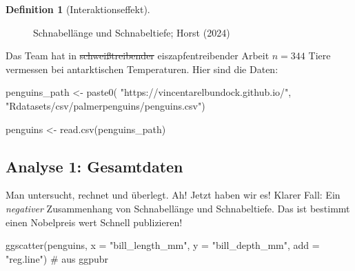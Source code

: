 \documentclass[
  letterpaper,
]{scrbook}
\newenvironment{Shaded}{\begin{snugshade}}{\end{snugshade}}
\newcommand{\AttributeTok}[1]{\textcolor[rgb]{0.40,0.45,0.13}{#1}}
\newcommand{\CommentTok}[1]{\textcolor[rgb]{0.37,0.37,0.37}{#1}}
\newcommand{\FunctionTok}[1]{\textcolor[rgb]{0.28,0.35,0.67}{#1}}
\newcommand{\NormalTok}[1]{\textcolor[rgb]{0.00,0.23,0.31}{#1}}
\newcommand{\OtherTok}[1]{\textcolor[rgb]{0.00,0.23,0.31}{#1}}
\newcommand{\StringTok}[1]{\textcolor[rgb]{0.13,0.47,0.30}{#1}}
\theoremstyle{definition}
\theoremstyle{definition}
\theoremstyle{definition}
\newtheorem{definition}{Definition}[chapter]
\theoremstyle{remark}
\begin{document}
\begin{definition}[Interaktionseffekt]
\begin{figure}


\caption{\label{fig-peng-bill}Schnabellänge und Schnabeltiefe; Horst
(2024)}

\end{figure}%

Das Team hat in \st{schweißtreibender} eiszapfentreibender Arbeit
\(n=344\) Tiere vermessen bei antarktischen Temperaturen. Hier sind die
Daten:

\begin{Shaded}
\begin{Highlighting}[]
\NormalTok{penguins\_path }\OtherTok{\textless{}{-}} \FunctionTok{paste0}\NormalTok{(}
  \StringTok{"https://vincentarelbundock.github.io/"}\NormalTok{,}
  \StringTok{"Rdatasets/csv/palmerpenguins/penguins.csv"}\NormalTok{)}

\NormalTok{penguins }\OtherTok{\textless{}{-}} \FunctionTok{read.csv}\NormalTok{(penguins\_path)}
\end{Highlighting}
\end{Shaded}

\subsection{Analyse 1: Gesamtdaten}\label{analyse-1-gesamtdaten}

Man untersucht, rechnet und überlegt. Ah! Jetzt haben wir es! Klarer
Fall: Ein \emph{negativer} Zusammenhang von Schnabellänge und
Schnabeltiefe. Das ist bestimmt einen Nobelpreis wert Schnell
publizieren!

\begin{Shaded}
\begin{Highlighting}[]
\FunctionTok{ggscatter}\NormalTok{(penguins, }\AttributeTok{x =} \StringTok{"bill\_length\_mm"}\NormalTok{, }\AttributeTok{y =} \StringTok{"bill\_depth\_mm"}\NormalTok{, }
          \AttributeTok{add =} \StringTok{"reg.line"}\NormalTok{)  }\CommentTok{\# aus \textasciigrave{}ggpubr\textasciigrave{}}
\end{Highlighting}
\end{Shaded}


\end{definition}
\end{document}
